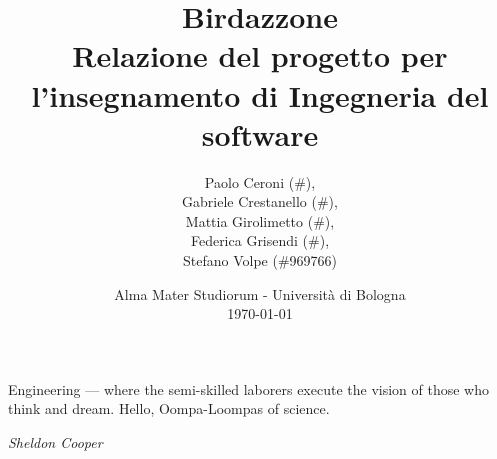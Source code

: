 \documentclass{article}
\title{
	\textbf{
		Birdazzone \\
	}
	\textbf{\large
		Relazione del progetto per l'insegnamento di \break
		Ingegneria del software
	}
}
\author{
	Paolo Ceroni (\#), \\
	Gabriele Crestanello (\#), \\
	Mattia Girolimetto (\#), \\
	Federica Grisendi (\#), \\
	Stefano Volpe (\#969766)
}
\date{
	Alma Mater Studiorum - Universit\`a di Bologna \\
	\today
}
\begin{document}
\maketitle

\epigraph{
	Engineering --- where the semi-skilled laborers execute the vision of those
	who think and dream. Hello, Oompa-Loompas of science.
}{\textit{Sheldon Cooper}}
\end{document}
